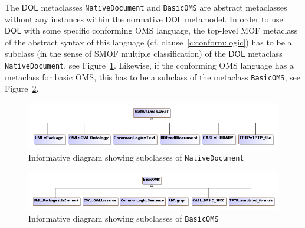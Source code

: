 \documentclass[10pt, a4paper]{isov2}
\makeatletter
\newcommand*{\cf}{cf.\@\xspace}
\newcommand*{\syntax}[1]{\texttt{#1}}
\newcommand*{\DOL}{\ensuremath{\mathsf{DOL}}\xspace}
\renewcommand{\clauserefname}{clause}
\renewcommand{\cref}[1]{\clauserefname~\ref{#1}}
\makeatother
\begin{document}
The \DOL metaclasses \syntax{NativeDocument} and \syntax{BasicOMS} are
abstract metaclasses without any instances within the normative \DOL
metamodel.  In order to use \DOL with some specific conforming OMS language, the top-level MOF
metaclass of the abstract syntax of this language
(\cf \cref{c:conform:logic}) has to be a subclass (in the sense of
SMOF multiple classification) of the \DOL metaclass
\syntax{NativeDocument}, see Figure~\ref{fig:native_document}.
Likewise, if the conforming OMS language has a metaclass for basic OMS,
this has to be a subclass of the metaclass \syntax{BasicOMS},
see Figure~\ref{fig:basic_oms}.



\begin{figure}[b]
  \centering
    \includegraphics[width=\textwidth]{mof/native_document.png}
   \caption{Informative diagram showing subclasses of \syntax{NativeDocument}}
   \label{fig:native_document}
\end{figure}

\begin{figure}
  \centering
    \includegraphics[width=\textwidth]{mof/basic_oms.png}
   \caption{Informative diagram showing subclasses of \syntax{BasicOMS}}
   \label{fig:basic_oms}
\end{figure}


\label{c:libraries}


\end{document}
